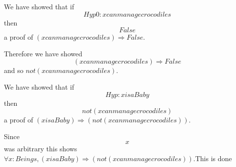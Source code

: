 \documentclass[11pt, oneside]{article}
\begin{document}
 We have showed that if $$Hyp0 : x can manage crocodiles $$ then $$False $$ a proof of $(x can manage crocodiles) \Rightarrow False $.

 Therefore we have showed $$(x can manage crocodiles) \Rightarrow False $$ and so $not (x can manage crocodiles) $.

 We have showed that if $$Hyp : x is a Baby $$ then $$not (x can manage crocodiles) $$ a proof of $(x is a Baby) \Rightarrow (not (x can manage crocodiles)) $.

 Since $$x$$ was arbitrary this shows $\forall x : Beings, (x is a Baby) \Rightarrow (not (x can manage crocodiles)) $.This is done
\end{document}
